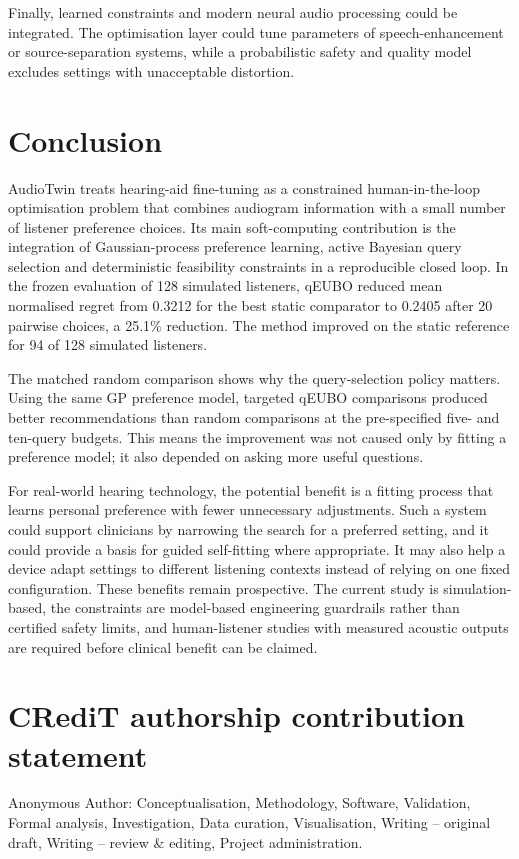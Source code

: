 \documentclass[preprint,12pt]{elsarticle}
\begin{document}
Finally, learned constraints and modern neural audio processing could be integrated. The optimisation layer could tune parameters of speech-enhancement or source-separation systems, while a probabilistic safety and quality model excludes settings with unacceptable distortion.

\section{Conclusion}
\label{sec:conclusion}

AudioTwin treats hearing-aid fine-tuning as a constrained human-in-the-loop optimisation problem that combines audiogram information with a small number of listener preference choices. Its main soft-computing contribution is the integration of Gaussian-process preference learning, active Bayesian query selection and deterministic feasibility constraints in a reproducible closed loop. In the frozen evaluation of 128 simulated listeners, qEUBO reduced mean normalised regret from 0.3212 for the best static comparator to 0.2405 after 20 pairwise choices, a 25.1\% reduction. The method improved on the static reference for 94 of 128 simulated listeners.

The matched random comparison shows why the query-selection policy matters. Using the same GP preference model, targeted qEUBO comparisons produced better recommendations than random comparisons at the pre-specified five- and ten-query budgets. This means the improvement was not caused only by fitting a preference model; it also depended on asking more useful questions.

For real-world hearing technology, the potential benefit is a fitting process that learns personal preference with fewer unnecessary adjustments. Such a system could support clinicians by narrowing the search for a preferred setting, and it could provide a basis for guided self-fitting where appropriate. It may also help a device adapt settings to different listening contexts instead of relying on one fixed configuration. These benefits remain prospective. The current study is simulation-based, the constraints are model-based engineering guardrails rather than certified safety limits, and human-listener studies with measured acoustic outputs are required before clinical benefit can be claimed.

\section*{CRediT authorship contribution statement}
Anonymous Author: Conceptualisation, Methodology, Software, Validation, Formal analysis, Investigation, Data curation, Visualisation, Writing -- original draft, Writing -- review \& editing, Project administration.
\end{document}
